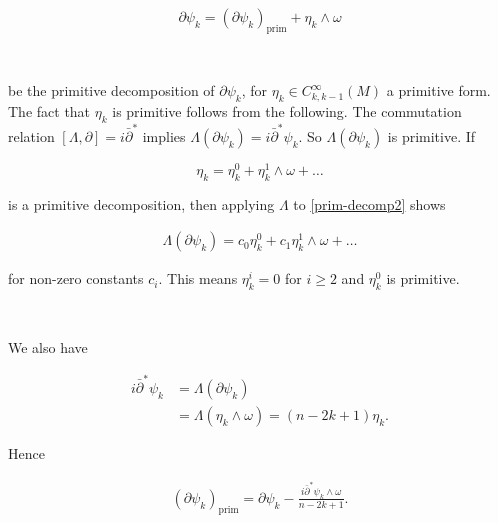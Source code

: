 \documentclass[11pt,letterpaper]{amsart}
\newcommand{\sbpartial}{\bar{\partial}^*}
\newcommand{\spartial}{\partial^*}
\newcommand{\bpartial}{\bar{\partial}}
\numberwithin{equation}{section}
\begin{document}
\begin{equation}\label{prim-decomp2}
\partial \psi_k = (\partial \psi_k)_{\text{prim}} + \eta_k \wedge \omega 
\end{equation}

\

\noindent be the primitive decomposition of $\partial \psi_k$, for $\eta_k\in C^{\infty}_{k,k-1}(M)$ a primitive form. The fact that $\eta_k$ is primitive follows from the following. The commutation relation $[\Lambda, \partial] = i\bar{\partial}^*$ implies $\Lambda(\partial \psi_k) = i \sbpartial \psi_k$. So $\Lambda(\partial \psi_{k})$ is primitive. If 

$$\eta_k = \eta_k^0 + \eta_k^1 \wedge \omega + \dots $$

\noindent is a primitive decomposition, then applying $\Lambda$ to \eqref{prim-decomp2} shows

\begin{equation}
    \begin{aligned}
    \Lambda(\partial\psi_k) = c_0 \eta_k^0 + c_1 \eta_k^1 \wedge \omega + \dots
    \end{aligned}
\end{equation}


\noindent for non-zero constants $c_i$. This means $\eta_k^i=0$ for $i\geq 2$ and $\eta^0_k$ is primitive.











\

We also have

\begin{equation}
    \begin{aligned}
        i \sbpartial \psi_k &= \Lambda(\partial \psi_k) \\
        &= \Lambda(\eta_k \wedge \omega) = (n-2k+1) \eta_k.
    \end{aligned}
\end{equation}

Hence

\begin{equation}
    \begin{aligned}
        (\partial \psi_k)_{\text{prim}} = \partial \psi_k - \frac{i \sbpartial \psi_k \wedge \omega}{n-2k+1}.
    \end{aligned}
\end{equation}
\end{document}
